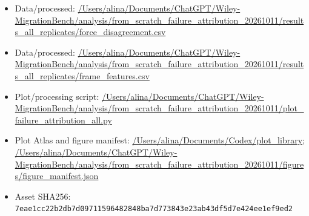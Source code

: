 \begin{itemize}[leftmargin=1.4em,noitemsep]
\item Data/processed: \begingroup\scriptsize\url{/Users/alina/Documents/ChatGPT/Wiley-MigrationBench/analysis/from_scratch_failure_attribution_20261011/results_all_replicates/force_disagreement.csv}\endgroup
\item Data/processed: \begingroup\scriptsize\url{/Users/alina/Documents/ChatGPT/Wiley-MigrationBench/analysis/from_scratch_failure_attribution_20261011/results_all_replicates/frame_features.csv}\endgroup
\item Plot/processing script: \begingroup\scriptsize\url{/Users/alina/Documents/ChatGPT/Wiley-MigrationBench/analysis/from_scratch_failure_attribution_20261011/plot_failure_attribution_all.py}\endgroup
\item Plot Atlas and figure manifest: \begingroup\scriptsize\url{/Users/alina/Documents/Codex/plot_library}\endgroup; \url{/Users/alina/Documents/ChatGPT/Wiley-MigrationBench/analysis/from_scratch_failure_attribution_20261011/figures/figure_manifest.json}
\item Asset SHA256: \texttt{7eae1cc22b2db7d09711596482848ba7d773843e23ab43df5d7e424ee1ef9ed2}
\end{itemize}
